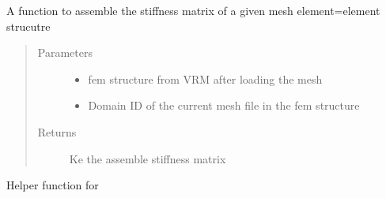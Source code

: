 \documentclass[a4paper,10pt,english]{sphinxmanual}
\begin{document}

\begin{fulllineitems}
\label{\detokenize{index:mGRF.getAssembledKe}}
A function to assemble the stiffness matrix of a given mesh
element=element strucutre
\begin{quote}\begin{description}
\item[{Parameters}] \leavevmode\begin{itemize}
\item {} 
 \textendash{} fem structure from VRM after loading the mesh

\item {} 
 \textendash{} Domain ID of the current mesh file in the fem structure

\end{itemize}

\item[{Returns}] \leavevmode
Ke the assemble stiffness matrix

\end{description}\end{quote}

\end{fulllineitems}


\begin{fulllineitems}
\label{\detokenize{index:mGRF.getElementStifness}}
Helper function for {\hyperref[\detokenize{index:mGRF.getAssembledKe}]{}}

\end{fulllineitems}

\end{document}
